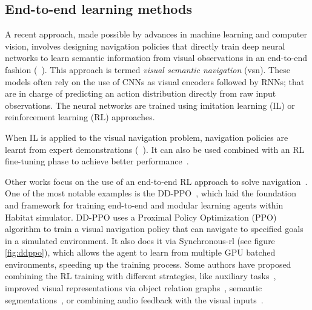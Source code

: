 \subsection{End-to-end learning methods}\label{subsec:end-to-end-learning-methods}

A recent approach, made possible by advances in machine learning and computer vision, involves designing navigation policies that directly train deep neural networks to learn semantic information from visual observations in an end-to-end fashion (\eg~\cite{ramrakhya2022, yadav2022, gutierrez2019, khandelwal2022, chaplot2020,chang2020}).
This approach is termed \textit{visual semantic navigation} (\acrshort{vsn}).
These models often rely on the use of CNNs as visual encoders followed by RNNs; that are in charge of predicting an action distribution directly from raw input observations.
The neural networks are trained using imitation learning (IL) or reinforcement learning (RL) approaches.

When IL is applied to the visual navigation problem, navigation policies are learnt from expert demonstrations (\eg~\cite{ramrakhya2022,yadav2022}).
It can also be used combined with an RL fine-tuning phase to achieve better performance~\cite{ramrakhya2023}.

Other works focus on the use of an end-to-end RL approach to solve \objnav navigation~\cite{zhu2017, gutierrez2019, khandelwal2022, Liu2022, Yadav2023OVRLV2AS, Xu2024DeepRL, YokoyamaHM3DOVONAD}.
One of the most notable examples is the DD-PPO~\cite{wijmans2020}, which laid the foundation and framework for training end-to-end and modular learning agents within Habitat simulator.
DD-PPO uses a Proximal Policy Optimization (PPO)~\cite{schulman2017} algorithm to train a visual navigation policy that can navigate to specified goals in a simulated environment.
It also does it via Synchronous-\acrshort{rl} (see figure \ref{fig:ddppo}), which allows the agent to learn from multiple GPU batched environments, speeding up the training process.
Some authors have proposed combining the RL training with different strategies, like auxiliary tasks~\cite{ye2021}, improved visual representations via object relation graphs~\cite{yang2018}, semantic segmentations~,\cite{Mousavian2018} or combining audio feedback with the visual inputs~\cite{Wang2023, Kondoh2023MultigoalAN}.


